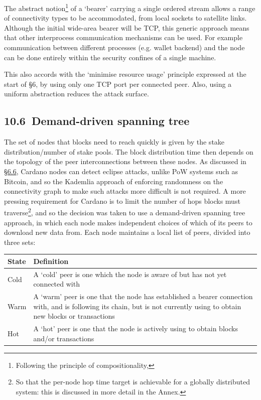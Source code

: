 \documentclass[]{article}
\begin{document}
The abstract notion\footnote{Following the principle of
  compositionality,} of a `bearer' carrying a single ordered stream
allows a range of connectivity types to be accommodated, from local
sockets to satellite links. Although the initial wide-area bearer will
be TCP, this generic approach means that other interprocess
communication mechanisms can be used. For example communication between
different processes (e.g. wallet backend) and the node can be done
entirely within the security confines of a single machine.

This also accords with the `minimise resource usage' principle expressed
at the start of §6, by using only one TCP port per connected peer. Also,
using a uniform abstraction reduces the attack surface.

\hypertarget{demand-driven-spanning-tree}{%
\subsection{​10.6​~Demand-driven spanning
tree}\label{demand-driven-spanning-tree}}

The set of nodes that blocks need to reach quickly is given by the stake
distribution/number of stake pools. The block distribution time then
depends on the topology of the peer interconnections between these
nodes. As discussed in
\protect\hyperlink{decentralisation-constraints}{{§6.6}}, Cardano nodes
can detect eclipse attacks, unlike PoW systems such as Bitcoin, and so
the Kademlia approach of enforcing randomness on the connectivity graph
to make such attacks more difficult is not required. A more pressing
requirement for Cardano is to limit the number of hops blocks must
traverse\footnote{So that the per-node hop time target is achievable for
  a globally distributed system: this is discussed in more detail in the
  Annex.}, and so the decision was taken to use a demand-driven spanning
tree approach, in which each node makes independent choices of which of
its peers to download new data from. Each node maintains a local list of
peers, divided into three sets:

\begin{longtable}[]{@{}ll@{}}
\toprule
\textbf{State} & \textbf{Definition}\tabularnewline
\midrule
\endhead
Cold & A `cold' peer is one which the node is aware of but has not yet
connected with\tabularnewline
Warm & A `warm' peer is one that the node has established a bearer
connection with, and is following its chain, but is not currently using
to obtain new blocks or transactions\tabularnewline
Hot & A `hot' peer is one that the node is actively using to obtain
blocks and/or transactions\tabularnewline
\bottomrule
\end{longtable}
\end{document}

